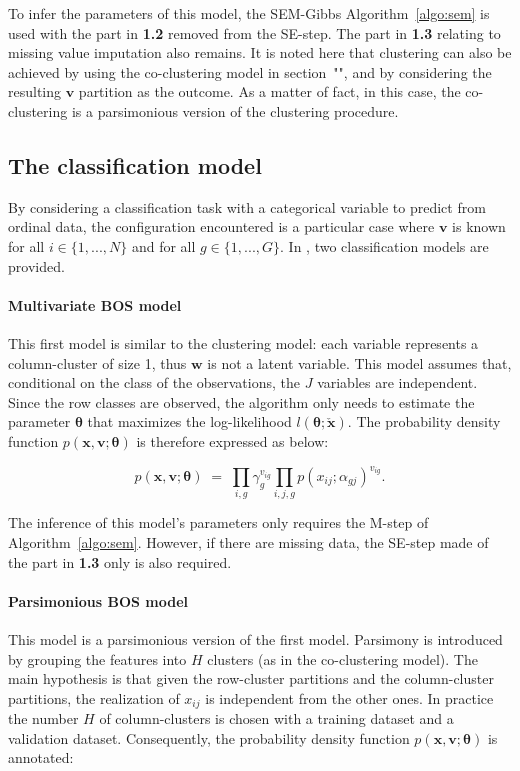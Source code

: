 \noindent To infer the parameters of this model, the SEM-Gibbs Algorithm~\ref{algo:sem} is used with the part in {\bf 1.2} removed from the SE-step. The part in {\bf 1.3} relating to missing value imputation also remains. It is noted here that clustering can also be achieved by using the co-clustering model in section~"", and by considering the resulting $\boldsymbol{v}$ partition as the outcome. As a matter of fact, in this case, the co-clustering is a parsimonious version of the clustering procedure.


\subsection{The classification model}
By considering a classification task with a categorical variable to predict from ordinal data, the configuration encountered is a particular case where $\boldsymbol{v}$ is known for all $i \in \{1,...,N\}$  and for all $g \in \{1,...,G\}$. In , two classification models are provided.

\paragraph{Multivariate BOS model} This first model is similar to the clustering model: each variable represents a column-cluster of size 1, thus $\boldsymbol{w}$ is not a latent variable. This model assumes that, conditional on the class of the observations, the $J$ variables are independent. Since the row classes are observed, the algorithm only needs to estimate the parameter $\boldsymbol{\theta}$ that maximizes the log-likelihood $l\left(\boldsymbol{\theta};\check{\boldsymbol{x}}\right)$. The probability density function $p\left(\boldsymbol{x},\boldsymbol{v};\boldsymbol{\theta}\right)$ is therefore expressed as below: 

\begin{equation}
\label{eq:classif1}
  p\left(\boldsymbol{x},\boldsymbol{v};\boldsymbol{\theta}\right) \;=\;
  \underset{i,g}{\prod}\gamma_g^{v_{ig}} 
    \underset{i,j,g}{\prod}p\left(x_{ij};\alpha_{gj}\right)^{v_{ig}}.
\end{equation}

\noindent The inference of this model's parameters only requires the M-step of Algorithm~\ref{algo:sem}. However, if there are missing data, the SE-step made of the part in {\bf 1.3} only is also required.


\paragraph{Parsimonious BOS model} This model is a parsimonious version of the first model. Parsimony is introduced by grouping the features into $H$ clusters (as in the co-clustering model). The main hypothesis is that given the row-cluster partitions and the column-cluster partitions, the realization of $x_{ij}$ is independent from the other ones. In practice the number $H$ of column-clusters is chosen with a training dataset and a validation dataset. Consequently, the probability density function $p\left(\boldsymbol{x,v};\boldsymbol{\theta}\right)$ is annotated:

